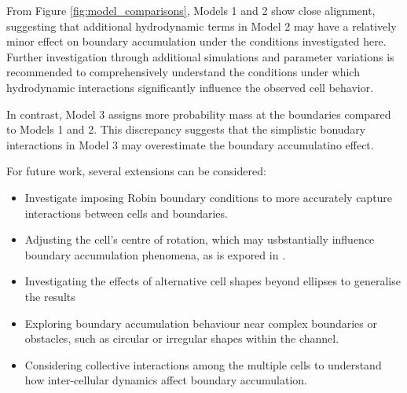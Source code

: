 From Figure \ref{fig:model_comparisons}, Models 1 and 2 show close alignment, suggesting that additional hydrodynamic
terms in Model 2 may have a relatively minor effect on boundary accumulation under the conditions investigated here.
Further investigation through additional simulations and parameter variations is recommended to comprehensively 
understand the conditions under which hydrodynamic interactions significantly influence the observed cell behavior.

In contrast, Model 3 assigns more probability mass at the boundaries compared to Models 1 and 2. This discrepancy 
suggests that the simplistic bonudary interactions in Model 3 may overestimate the boundary accumulatino effect.

For future work, several extensions can be considered:

\begin{itemize}
    \item Investigate imposing Robin boundary conditions to more accurately capture 
    interactions between cells and boundaries.
    \item Adjusting the cell's centre of rotation, which may usbstantially influence boundary accumulation
    phenomena, as is expored in \cite{chen2021shape}.
    \item Investigating the effects of alternative cell shapes beyond ellipses to generalise the results
    \item Exploring boundary accumulation behaviour near complex boundaries or obstacles, such as circular or 
    irregular shapes within the channel.
    \item Considering collective interactions among the multiple cells to understand how inter-cellular dynamics affect 
    boundary accumulation. 
\end{itemize}


